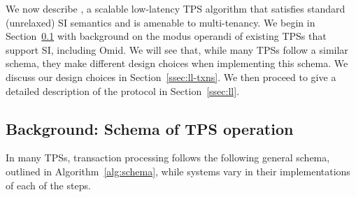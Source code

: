 

We now describe \sysll, a scalable low-latency TPS algorithm 
that satisfies standard (unrelaxed) SI semantics and is amenable to multi-tenancy.
We begin in Section~\ref{ssec:schema} with  background on the modus operandi of existing TPSs that support SI, including Omid. 
We will see that, while many TPSs follow a similar schema,  they make different design choices when implementing this schema. 
We discuss our design choices in Section~\ref{ssec:ll-txns}. 
We then proceed to give a detailed description of the protocol
in Section~\ref{ssec:ll}.

\subsection{Background: Schema of TPS operation}
\label{ssec:schema}


In many TPSs, transaction processing follows the following general schema, outlined in Algorithm~\ref{alg:schema}, 
while systems vary in their implementations of each of the steps.


